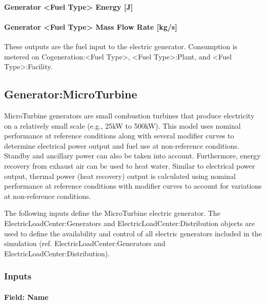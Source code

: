 \paragraph{Generator \textless{}Fuel Type\textgreater{} Energy {[}J{]}}\label{generator-fuel-type-energy-j-1}

\paragraph{Generator \textless{}Fuel Type\textgreater{} Mass Flow Rate {[}kg/s{]}}\label{generator-fuel-type-mass-flow-rate-kgs-1}

These outputs are the fuel input to the electric generator. Consumption is metered on Cogeneration:\textless{}Fuel Type\textgreater{}, \textless{}Fuel Type\textgreater{}:Plant, and \textless{}Fuel Type\textgreater{}:Facility.

\subsection{Generator:MicroTurbine}\label{generatormicroturbine}

MicroTurbine generators are small combustion turbines that produce electricity on a relatively small scale (e.g., 25kW to 500kW). This model uses nominal performance at reference conditions along with several modifier curves to determine electrical power output and fuel use at non-reference conditions. Standby and ancillary power can also be taken into account. Furthermore, energy recovery from exhaust air can be used to heat water. Similar to electrical power output, thermal power (heat recovery) output is calculated using nominal performance at reference conditions with modifier curves to account for variations at non-reference conditions.

The following inputs define the MicroTurbine electric generator. The ElectricLoadCenter:Generators and ElectricLoadCenter:Distribution objects are used to define the availability and control of all electric generators included in the simulation (ref. ElectricLoadCenter:Generators and ElectricLoadCenter:Distribution).

\subsubsection{Inputs}\label{inputs-9-004}

\paragraph{Field: Name}\label{field-name-10-003}

